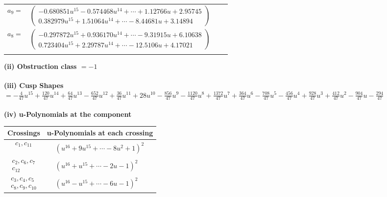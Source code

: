 \documentclass[1p]{elsarticle_modified}
\theoremstyle{definition}
\begin{document}
\begin{tabular}{m{7pt} m{180pt} m{7pt} m{180pt} }
\flushright $a_{9}=$&$\begin{pmatrix}-0.680851 u^{15}-0.574468 u^{14}+\cdots+1.12766 u+2.95745\\0.382979 u^{15}+1.51064 u^{14}+\cdots-8.44681 u+3.14894\end{pmatrix}$ \\
\flushright $a_{8}=$&$\begin{pmatrix}-0.297872 u^{15}+0.936170 u^{14}+\cdots-9.31915 u+6.10638\\0.723404 u^{15}+2.29787 u^{14}+\cdots-12.5106 u+4.17021\end{pmatrix}$\\&\end{tabular}
\flushleft \textbf{(ii) Obstruction class $= -1$}\\~\\
\flushleft \textbf{(iii) Cusp Shapes $= -\frac{4}{47} u^{15}+\frac{120}{47} u^{14}+\frac{64}{47} u^{13}-\frac{652}{47} u^{12}+\frac{36}{47} u^{11}+28 u^{10}-\frac{856}{47} u^9-\frac{1120}{47} u^8+\frac{1372}{47} u^7+\frac{364}{47} u^6-\frac{708}{47} u^5-\frac{456}{47} u^4+\frac{928}{47} u^3+\frac{412}{47} u^2-\frac{904}{47} u-\frac{294}{47}$}\\~\\
\newpage\renewcommand{\arraystretch}{1}
\flushleft \textbf{(iv) u-Polynomials at the component}\newline \\
\begin{tabular}{m{50pt}|m{274pt}}
Crossings & \hspace{64pt}u-Polynomials at each crossing \\
\hline $$\begin{aligned}c_{1},c_{11}\end{aligned}$$&$\begin{aligned}
&(u^{16}+9 u^{15}+\cdots-8 u^2+1)^{2}
\end{aligned}$\\
\hline $$\begin{aligned}c_{2},c_{6},c_{7}\\c_{12}\end{aligned}$$&$\begin{aligned}
&(u^{16}+u^{15}+\cdots-2 u-1)^{2}
\end{aligned}$\\
\hline $$\begin{aligned}c_{3},c_{4},c_{5}\\c_{8},c_{9},c_{10}\end{aligned}$$&$\begin{aligned}
&(u^{16}- u^{15}+\cdots-6 u-1)^{2}
\end{aligned}$\\
\hline
\end{tabular}\\~\\
\end{document}
